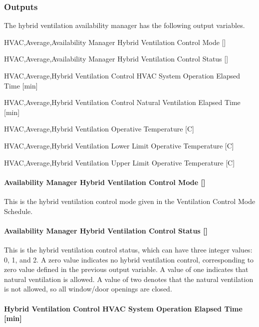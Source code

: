 \subsubsection{Outputs}\label{outputs-9-008}

The hybrid ventilation availability manager has the following output variables.

HVAC,Average,Availability Manager Hybrid Ventilation Control Mode {[]}

HVAC,Average,Availability Manager Hybrid Ventilation Control Status {[]}

HVAC,Average,Hybrid Ventilation Control HVAC System Operation Elapsed Time {[min]}

HVAC,Average,Hybrid Ventilation Control Natural Ventilation Elapsed Time {[min]}

HVAC,Average,Hybrid Ventilation Operative Temperature {[C]}

HVAC,Average,Hybrid Ventilation Lower Limit Operative Temperature {[C]}

HVAC,Average,Hybrid Ventilation Upper Limit Operative Temperature {[C]}

\paragraph{Availability Manager Hybrid Ventilation Control Mode {[]}}\label{availability-manager-hybrid-ventilation-control-mode}

This is the hybrid ventilation control mode given in the Ventilation Control Mode Schedule.

\paragraph{Availability Manager Hybrid Ventilation Control Status {[]}}\label{availability-manager-hybrid-ventilation-control-status}

This is the hybrid ventilation control status, which can have three integer values: 0, 1, and 2. A zero value indicates no hybrid ventilation control, corresponding to zero value defined in the previous output variable. A value of one indicates that natural ventilation is allowed. A value of two denotes that the natural ventilation is not allowed, so all window/door openings are closed.

\paragraph{Hybrid Ventilation Control HVAC System Operation Elapsed Time {[min]}}\label{hybrid-ventilation-control-hvac-system-operation-elapsed-time}

